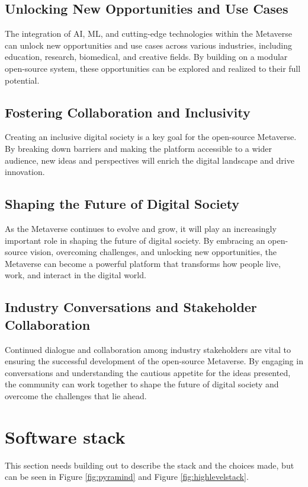 \subsection{Unlocking New Opportunities and Use Cases}
The integration of AI, ML, and cutting-edge technologies within the Metaverse can unlock new opportunities and use cases across various industries, including education, research, biomedical, and creative fields. By building on a modular open-source system, these opportunities can be explored and realized to their full potential.

\subsection{Fostering Collaboration and Inclusivity}
Creating an inclusive digital society is a key goal for the open-source Metaverse. By breaking down barriers and making the platform accessible to a wider audience, new ideas and perspectives will enrich the digital landscape and drive innovation.

\subsection{Shaping the Future of Digital Society}
As the Metaverse continues to evolve and grow, it will play an increasingly important role in shaping the future of digital society. By embracing an open-source vision, overcoming challenges, and unlocking new opportunities, the Metaverse can become a powerful platform that transforms how people live, work, and interact in the digital world.
\subsection{Industry Conversations and Stakeholder Collaboration}
Continued dialogue and collaboration among industry stakeholders are vital to ensuring the successful development of the open-source Metaverse. By engaging in conversations and understanding the cautious appetite for the ideas presented, the community can work together to shape the future of digital society and overcome the challenges that lie ahead.


\section{Software stack}
This section needs building out to describe the stack and the choices made, but can be seen in Figure \ref{fig:pyramind} and Figure \ref{fig:highlevelstack}.

